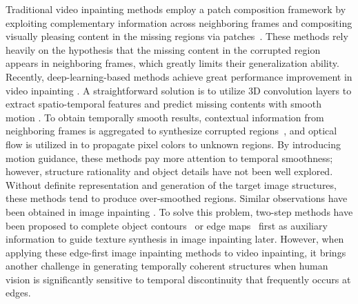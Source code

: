 Traditional video inpainting methods employ a patch composition framework by exploiting complementary information across neighboring frames and compositing visually pleasing content in the missing regions via patches~\cite{patwardhan2007video,wexler2004space,newson2014video}.
% 
These methods rely heavily on the hypothesis that the missing content in the corrupted region appears in neighboring frames, which greatly limits their generalization ability.
%
Recently, deep-learning-based methods achieve great performance improvement in video inpainting \cite{wang2019video,Kim_2019_CVPR1,Xu_2019_CVPR,Kim_2019_CVPR}.
A straightforward solution is to utilize 3D convolution layers to extract spatio-temporal features and predict missing contents with smooth motion \cite{wang2019video}.
To obtain temporally smooth results, contextual information from neighboring frames is aggregated to synthesize corrupted regions~\cite{Kim_2019_CVPR1,Kim_2019_CVPR}, and optical flow is utilized in \cite{Xu_2019_CVPR} to propagate pixel colors to unknown regions. 
By introducing motion guidance, these methods pay more attention to temporal smoothness; however, structure rationality and object details have not been well explored. 
%
Without definite representation and generation of the target image structures, these methods tend to produce over-smoothed regions. 
Similar observations have been obtained in image inpainting \cite{Xiong_2019_CVPR,nazeri2019edgeconnect}.
To solve this problem, two-step methods have been proposed to complete object contours~\cite{Xiong_2019_CVPR} or edge maps~\cite{nazeri2019edgeconnect} first as auxiliary information to guide texture synthesis in image inpainting later.
%
However, when applying these edge-first image inpainting methods to video inpainting, it brings another challenge in generating temporally coherent structures when human vision is significantly sensitive to temporal discontinuity that frequently occurs at edges. 


